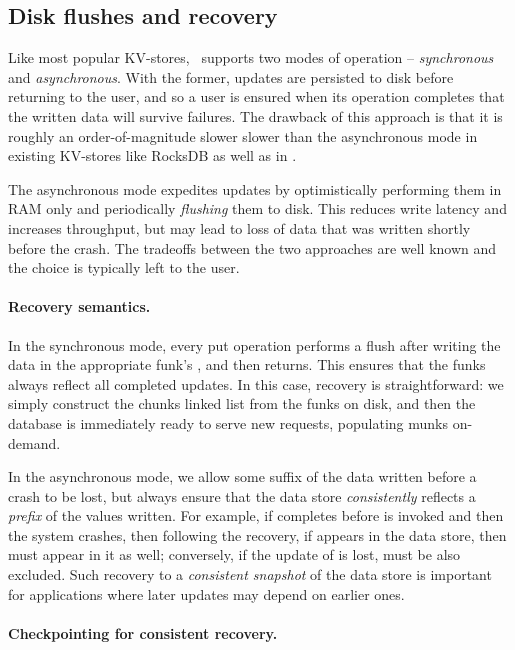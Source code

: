 \subsection{Disk flushes and recovery}
\label{ssec:flush-recovery}

Like most popular KV-stores, \sys\ supports two modes of operation -- \emph{synchronous} and \emph{asynchronous}. 
With the former,  updates are persisted to disk before returning to the user, and so a user is ensured when its operation
completes that the written data will survive failures. The drawback of this approach is that it is 
roughly an order-of-magnitude slower slower 
than the asynchronous mode in  existing KV-stores like RocksDB as well as in \sys. 

The asynchronous mode expedites updates by optimistically performing them in
RAM only and periodically \emph{flushing} them to disk. This reduces write latency and increases throughput, but 
may lead to loss of data that was written shortly before the crash. The tradeoffs between the two approaches are 
well known and the choice is typically left to the user.

\paragraph{Recovery semantics.}
In the synchronous mode, every put operation performs a flush after writing the data in the appropriate funk's , and then returns. 
This ensures that the funks always reflect all completed updates. In this case, recovery is straightforward: we simply construct
the chunks linked list from the funks on disk, and then the database is immediately ready to serve new requests, populating munks on-demand.  

In the asynchronous mode, we allow some suffix of the  data written before a crash to be lost, but always 
ensure that the data store \emph{consistently} reflects a \emph{prefix} of the  values written.
For example, if  completes before  
is invoked and then the system crashes, then following the recovery, 
if  appears in the data store, then  must appear in it as well; 
conversely, if the update of   is lost,   must be also excluded.
Such recovery to a \emph{consistent snapshot} of the data store is important for applications where later updates may depend on earlier ones. 

\paragraph{Checkpointing for consistent recovery.}

